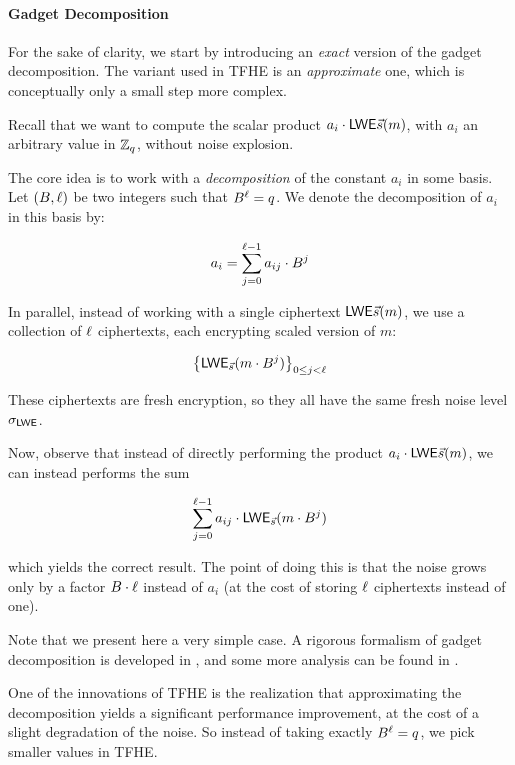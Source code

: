 \paragraph{Gadget Decomposition}

For the sake of clarity, we start by introducing an \textit{exact} version of the gadget decomposition. The variant used in TFHE is an \textit{approximate} one, which is conceptually only a small step more complex.


Recall that we want to compute the scalar product $a_i \cdot \textsf{LWE}{\vec s}(m)$, with $a_i$ an arbitrary value in $\mathbb{Z}_q$, without noise explosion.

The core idea is to work with a \textit{decomposition} of the constant $a_i$ in some basis. Let $(B, \ell)$ be two integers such that $B^\ell = q$. We denote the decomposition of $a_i$ in this basis by:

\[
	a_i = \sum_{j=0}^{\ell-1} a_{ij} \cdot B^j
\]

In parallel, instead of working with a single ciphertext $\textsf{LWE}{\vec s}(m)$, we use a collection of $\ell$ ciphertexts, each encrypting scaled version of $m$: 

\[
	\left \lbrace \textsf{LWE}_{\vec s}(m \cdot B^j) \right \rbrace_{0 \le j < \ell}
\]

These ciphertexts are fresh encryption, so they all have the same fresh noise level $\sigma_{\textsf{LWE}}$.

Now, observe that instead of directly performing the product $a_i \cdot \textsf{LWE}{\vec s}(m)$, we can instead performs the sum 

\[
	\sum_{j=0}^{\ell - 1} a_{ij} \cdot \textsf{LWE}_{\vec s}(m \cdot B^j)
\]

which yields the correct result. The point of doing this is that the noise grows only by a factor $B \cdot \ell$ instead of $a_i$ (at the cost of storing $\ell$ ciphertexts instead of one).

Note that we present here a very simple case. A rigorous formalism of gadget decomposition is developed in \cite{EC:GenMicPol19}, and some more analysis can be found in \cite{AC:Joye21}.


One of the innovations of TFHE is the realization that approximating the decomposition yields a significant performance improvement, at the cost of a slight degradation of the noise. So instead of taking exactly $B^\ell = q$, we pick smaller values in TFHE.


